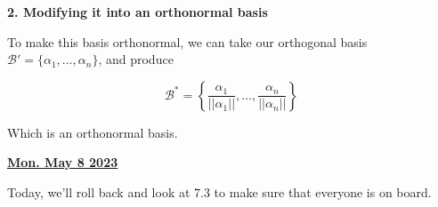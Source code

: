 \documentclass[12pt]{article}
\renewcommand{\date}[1]{\underline{\bf #1}}
\def\B{\mathcal B}
\begin{document}
  {\bf 2. Modifying it into an orthonormal basis}

  To make this basis orthonormal, we can take our orthogonal basis $\B' =
  \{\alpha_1, \dots, \alpha_n\}$, and produce

  \[
    \B^* = \left\{\frac{\alpha_1}{||\alpha_1||}, \dots, \frac{\alpha_n}{||\alpha_n||}\right\}
  \]

  Which is an orthonormal basis.

  \date{Mon. May 8 2023}


  Today, we'll roll back and look at 7.3 to make sure that everyone is on board.
\end{document}

